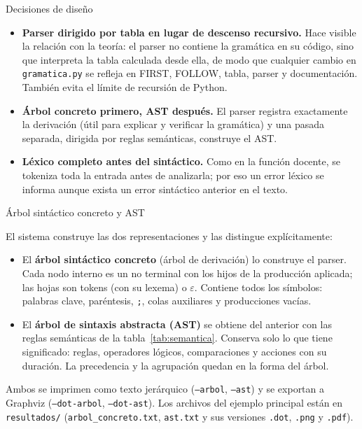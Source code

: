 \documentclass[11pt,letterpaper]{article}
\makeatletter
\renewcommand\section{\@startsection{section}{1}{\z@}{-3.2ex \@plus -1ex \@minus -.2ex}{1.6ex \@plus .2ex}%
  {\normalfont\Large\bfseries\color{acento}}}
\renewcommand\subsection{\@startsection{subsection}{2}{\z@}{-2.6ex\@plus -1ex \@minus -.2ex}{1.0ex \@plus .2ex}%
  {\normalfont\large\bfseries}}
\newcommand{\cod}[1]{\texttt{#1}}
\newcommand{\ruta}[1]{\nolinkurl{#1}}
\newcommand{\T}[1]{\texttt{#1}}
\newcommand{\eps}{\ensuremath{\varepsilon}}
\makeatother
\begin{document}
\subsection{Decisiones de diseño}
\begin{itemize}
\item \textbf{Parser dirigido por tabla en lugar de descenso recursivo.} Hace visible la relación con la teoría: el
parser no contiene la gramática en su código, sino que interpreta la tabla calculada desde ella, de modo que
cualquier cambio en \cod{gramatica.py} se refleja en FIRST, FOLLOW, tabla, parser y documentación. También evita
el límite de recursión de Python.
\item \textbf{Árbol concreto primero, AST después.} El parser registra exactamente la derivación (útil para
explicar y verificar la gramática) y una pasada separada, dirigida por reglas semánticas, construye el AST.
\item \textbf{Léxico completo antes del sintáctico.} Como en la función docente, se tokeniza toda la entrada antes de
analizarla; por eso un error léxico se informa aunque exista un error sintáctico anterior en el texto.
\end{itemize}

\section{Árbol sintáctico concreto y AST}\label{sec:arboles}

El sistema construye las dos representaciones y las distingue explícitamente:
\begin{itemize}
\item El \textbf{árbol sintáctico concreto} (árbol de derivación) lo construye el parser. Cada nodo interno es un no
terminal con los hijos de la producción aplicada; las hojas son tokens (con su lexema) o \eps. Contiene todos los
símbolos: palabras clave, paréntesis, \T{;}, colas auxiliares y producciones vacías.
\item El \textbf{árbol de sintaxis abstracta (AST)} se obtiene del anterior con las reglas semánticas de la
tabla~\ref{tab:semantica}. Conserva solo lo que tiene significado: reglas, operadores lógicos, comparaciones y
acciones con su duración. La precedencia y la agrupación quedan en la forma del árbol.
\end{itemize}
Ambos se imprimen como texto jerárquico (\T{--arbol}, \T{--ast}) y se exportan a Graphviz (\T{--dot-arbol},
\T{--dot-ast}). Los archivos del ejemplo principal están en \ruta{resultados/} (\ruta{arbol_concreto.txt},
\cod{ast.txt} y sus versiones \cod{.dot}, \cod{.png} y \cod{.pdf}).
\end{document}
